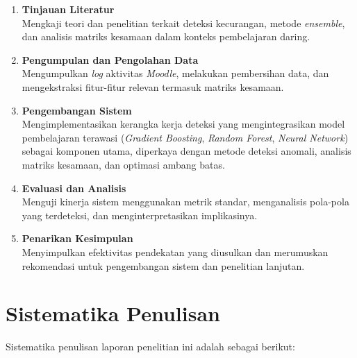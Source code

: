\begin{enumerate}
\item \textbf{Tinjauan Literatur}\\
Mengkaji teori dan penelitian terkait deteksi kecurangan, metode \textit{ensemble}, dan analisis matriks kesamaan dalam konteks pembelajaran daring.

\item \textbf{Pengumpulan dan Pengolahan Data}\\
Mengumpulkan \textit{log} aktivitas \textit{Moodle}, melakukan pembersihan data, dan mengekstraksi fitur-fitur relevan termasuk matriks kesamaan.

\item \textbf{Pengembangan Sistem}\\
Mengimplementasikan kerangka kerja deteksi yang mengintegrasikan model pembelajaran terawasi (\textit{Gradient Boosting}, \textit{Random Forest}, \textit{Neural Network}) sebagai komponen utama, diperkaya dengan metode deteksi anomali, analisis matriks kesamaan, dan optimasi ambang batas.

\item \textbf{Evaluasi dan Analisis}\\
Menguji kinerja sistem menggunakan metrik standar, menganalisis pola-pola yang terdeteksi, dan menginterpretasikan implikasinya.

\item \textbf{Penarikan Kesimpulan}\\
Menyimpulkan efektivitas pendekatan yang diusulkan dan merumuskan rekomendasi untuk pengembangan sistem dan penelitian lanjutan.
\end{enumerate}

\section{Sistematika Penulisan}
\label{sec:sistematikaPenulisan}

Sistematika penulisan laporan penelitian ini adalah sebagai berikut:

